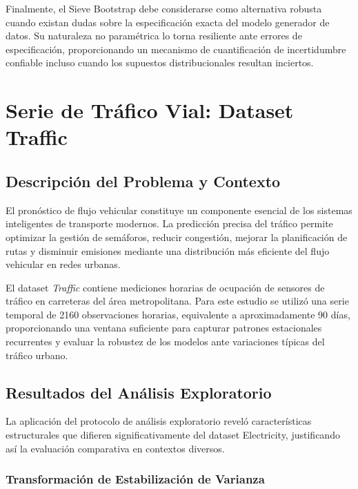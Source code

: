 Finalmente, el Sieve Bootstrap debe considerarse como alternativa robusta cuando existan dudas sobre la especificación exacta del modelo generador de datos. Su naturaleza no paramétrica lo torna resiliente ante errores de especificación, proporcionando un mecanismo de cuantificación de incertidumbre confiable incluso cuando los supuestos distribucionales resultan inciertos.


\section{Serie de Tráfico Vial: Dataset Traffic}
\label{sec:aplicacion_trafico}
\subsection{Descripción del Problema y Contexto}
\label{subsec:traffic_contexto}

El pronóstico de flujo vehicular constituye un componente esencial de los sistemas inteligentes de transporte modernos. La predicción precisa del tráfico permite optimizar la gestión de semáforos, reducir congestión, mejorar la planificación de rutas y disminuir emisiones mediante una distribución más eficiente del flujo vehicular en redes urbanas.

El dataset \textit{Traffic} contiene mediciones horarias de ocupación de sensores de tráfico en carreteras del área metropolitana. Para este estudio se utilizó una serie temporal de 2160 observaciones horarias, equivalente a aproximadamente 90 días, proporcionando una ventana suficiente para capturar patrones estacionales recurrentes y evaluar la robustez de los modelos ante variaciones típicas del tráfico urbano.

\subsection{Resultados del Análisis Exploratorio}
\label{subsec:traffic_eda_resultados}

La aplicación del protocolo de análisis exploratorio reveló características estructurales que difieren significativamente del dataset Electricity, justificando así la evaluación comparativa en contextos diversos.

\subsubsection{Transformación de Estabilización de Varianza}

